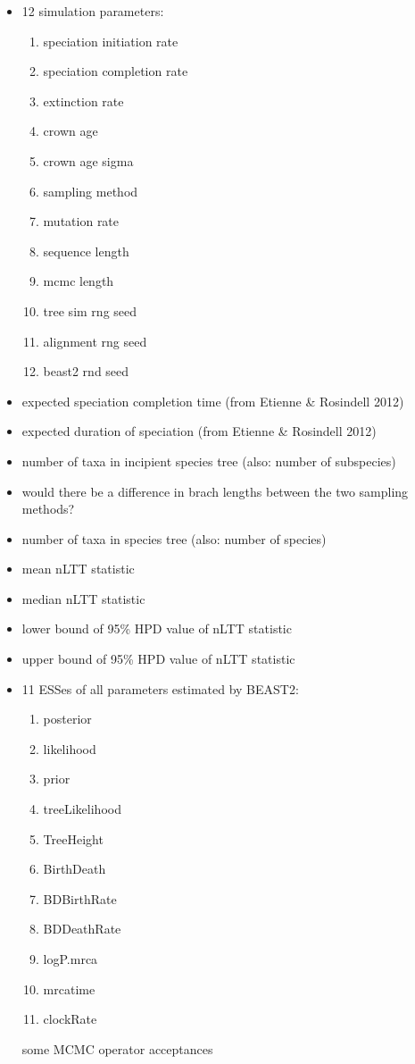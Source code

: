 \documentclass{article}
\begin{document}
\begin{itemize}  
  \item 12 simulation parameters:
  \begin{enumerate}  
    \item speciation initiation rate
    \item speciation completion rate
    \item extinction rate
    \item crown age
    \item crown age sigma
    \item sampling method
    \item mutation rate
    \item sequence length
    \item mcmc length
    \item tree sim rng seed
    \item alignment rng seed
    \item beast2 rnd seed
  \end{enumerate}
  \item expected speciation completion time (from Etienne & Rosindell 2012)
  \item expected duration of speciation (from Etienne & Rosindell 2012)
  \item number of taxa in incipient species tree (also: number of subspecies)
  \item would there be a difference in brach lengths between the two sampling methods?
  \item number of taxa in species tree (also: number of species)
  \item mean nLTT statistic
  \item median nLTT statistic
  \item lower bound of 95\% HPD value of nLTT statistic
  \item upper bound of 95\% HPD value of nLTT statistic
  \item 11 ESSes of all parameters estimated by BEAST2:
  \begin{enumerate}  
    \item posterior
    \item likelihood 
    \item prior 
    \item treeLikelihood 
    \item TreeHeight 
    \item BirthDeath 
    \item BDBirthRate 
    \item BDDeathRate 
    \item logP.mrca 
    \item mrcatime 
    \item clockRate
  \end{enumerate}
  \item [some] MCMC operator acceptances
\end{itemize}
\end{document}
